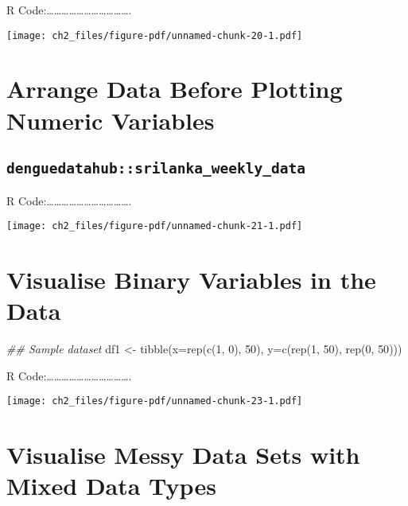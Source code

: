 \documentclass[
  letterpaper,
  DIV=11,
  numbers=noendperiod]{scrreprt}
\newenvironment{Shaded}{\begin{snugshade}}{\end{snugshade}}
\newcommand{\AttributeTok}[1]{\textcolor[rgb]{0.40,0.45,0.13}{#1}}
\newcommand{\DecValTok}[1]{\textcolor[rgb]{0.68,0.00,0.00}{#1}}
\newcommand{\DocumentationTok}[1]{\textcolor[rgb]{0.37,0.37,0.37}{\textit{#1}}}
\newcommand{\FunctionTok}[1]{\textcolor[rgb]{0.28,0.35,0.67}{#1}}
\newcommand{\NormalTok}[1]{\textcolor[rgb]{0.00,0.23,0.31}{#1}}
\newcommand{\OtherTok}[1]{\textcolor[rgb]{0.00,0.23,0.31}{#1}}
\begin{document}
R
Code:\ldots\ldots\ldots\ldots\ldots\ldots\ldots\ldots\ldots\ldots\ldots.

\texttt{[image: ch2\_files/figure-pdf/unnamed-chunk-20-1.pdf]}

\section{Arrange Data Before Plotting Numeric
Variables}\label{arrange-data-before-plotting-numeric-variables}

\subsection{\texorpdfstring{\texttt{denguedatahub::srilanka\_weekly\_data}}{denguedatahub::srilanka\_weekly\_data}}\label{denguedatahubsrilanka_weekly_data-2}

R
Code:\ldots\ldots\ldots\ldots\ldots\ldots\ldots\ldots\ldots\ldots\ldots.

\texttt{[image: ch2\_files/figure-pdf/unnamed-chunk-21-1.pdf]}

\section{Visualise Binary Variables in the
Data}\label{visualise-binary-variables-in-the-data}

\begin{Shaded}
\begin{Highlighting}[]
\DocumentationTok{\#\# Sample dataset}
\NormalTok{df1 }\OtherTok{\textless{}{-}} \FunctionTok{tibble}\NormalTok{(}\AttributeTok{x=}\FunctionTok{rep}\NormalTok{(}\FunctionTok{c}\NormalTok{(}\DecValTok{1}\NormalTok{, }\DecValTok{0}\NormalTok{), }\DecValTok{50}\NormalTok{), }\AttributeTok{y=}\FunctionTok{c}\NormalTok{(}\FunctionTok{rep}\NormalTok{(}\DecValTok{1}\NormalTok{, }\DecValTok{50}\NormalTok{), }\FunctionTok{rep}\NormalTok{(}\DecValTok{0}\NormalTok{, }\DecValTok{50}\NormalTok{)))}
\end{Highlighting}
\end{Shaded}

R
Code:\ldots\ldots\ldots\ldots\ldots\ldots\ldots\ldots\ldots\ldots\ldots.

\texttt{[image: ch2\_files/figure-pdf/unnamed-chunk-23-1.pdf]}

\section{Visualise Messy Data Sets with Mixed Data
Types}\label{visualise-messy-data-sets-with-mixed-data-types}
\end{document}
